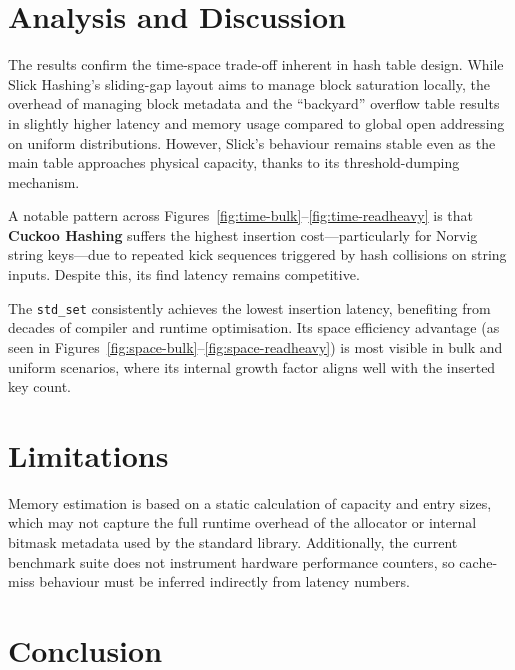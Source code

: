 \documentclass[11pt,a4paper]{article}
\begin{document}
\section{Analysis and Discussion}

The results confirm the time-space trade-off inherent in hash table design. While Slick Hashing's sliding-gap layout aims to manage block saturation locally, the overhead of managing block metadata and the ``backyard'' overflow table results in slightly higher latency and memory usage compared to global open addressing on uniform distributions. However, Slick's behaviour remains stable even as the main table approaches physical capacity, thanks to its threshold-dumping mechanism.

A notable pattern across Figures~\ref{fig:time-bulk}--\ref{fig:time-readheavy} is that \textbf{Cuckoo Hashing} suffers the highest insertion cost---particularly for Norvig string keys---due to repeated kick sequences triggered by hash collisions on string inputs. Despite this, its find latency remains competitive.

The \texttt{std\_set} consistently achieves the lowest insertion latency, benefiting from decades of compiler and runtime optimisation. Its space efficiency advantage (as seen in Figures~\ref{fig:space-bulk}--\ref{fig:space-readheavy}) is most visible in bulk and uniform scenarios, where its internal growth factor aligns well with the inserted key count.

\section{Limitations}

Memory estimation is based on a static calculation of capacity and entry sizes, which may not capture the full runtime overhead of the allocator or internal bitmask metadata used by the standard library. Additionally, the current benchmark suite does not instrument hardware performance counters, so cache-miss behaviour must be inferred indirectly from latency numbers.

\section{Conclusion}
\end{document}
